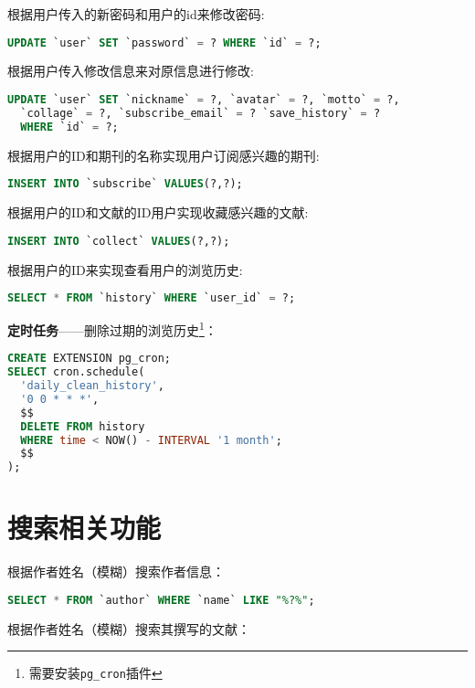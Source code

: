 \documentclass[UTF8,openany]{ctexbook}
\begin{document}
根据用户传入的新密码和用户的id来修改密码:

\begin{lstlisting}[language=SQL]
UPDATE `user` SET `password` = ? WHERE `id` = ?;
\end{lstlisting}

根据用户传入修改信息来对原信息进行修改:

\begin{lstlisting}[language=SQL]
UPDATE `user` SET `nickname` = ?, `avatar` = ?, `motto` = ?, 
  `collage` = ?, `subscribe_email` = ? `save_history` = ? 
  WHERE `id` = ?;
\end{lstlisting}

根据用户的ID和期刊的名称实现用户订阅感兴趣的期刊:

\begin{lstlisting}[language=SQL]
INSERT INTO `subscribe` VALUES(?,?);
\end{lstlisting}

根据用户的ID和文献的ID用户实现收藏感兴趣的文献:

\begin{lstlisting}[language=SQL]
INSERT INTO `collect` VALUES(?,?); 
\end{lstlisting}

根据用户的ID来实现查看用户的浏览历史:

\begin{lstlisting}[language=SQL]
SELECT * FROM `history` WHERE `user_id` = ?;
\end{lstlisting}

\textbf{定时任务}——删除过期的浏览历史\footnote{需要安装\texttt{pg\_cron}插件}：

\begin{lstlisting}[language=sql]
CREATE EXTENSION pg_cron;
SELECT cron.schedule(
  'daily_clean_history',  
  '0 0 * * *',
  $$
  DELETE FROM history
  WHERE time < NOW() - INTERVAL '1 month';
  $$
);
\end{lstlisting}


\section{搜索相关功能}

根据作者姓名（模糊）搜索作者信息：

\begin{lstlisting}[language=sql]
SELECT * FROM `author` WHERE `name` LIKE "%?%";
\end{lstlisting}

根据作者姓名（模糊）搜索其撰写的文献：
\end{document}
